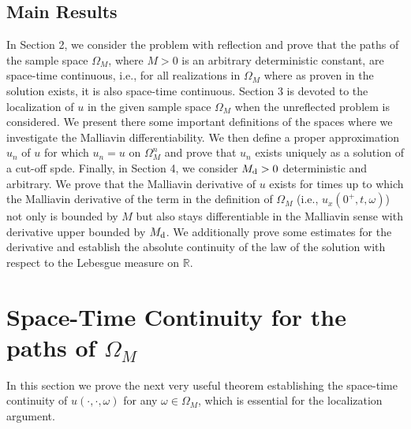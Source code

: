 \documentclass[reqno]{amsart}
\numberwithin{equation}{section}
\newcommand{\seira}[3]{\sum\limits_{#1}^{#2} #3}
\begin{document}
\subsection{Main Results}
In Section 2, we consider the problem with reflection and prove that the paths of the sample space $\Omega_M$, where $M>0$ is an arbitrary deterministic constant, are space-time continuous, i.e., for all realizations in $\Omega_M$ where as proven in \cite{BH,AFK2} the solution exists, it is also space-time continuous. Section 3 is devoted to the localization of $u$ in the given sample space $\Omega_M$ when the unreflected problem is considered. We present there some important definitions of the spaces where we investigate the Malliavin differentiability. We then define a proper approximation $u_n$ of $u$ for which $u_n=u$ on $\Omega_M^n$ and prove that $u_n$ exists uniquely as a solution of a cut-off spde. Finally, in Section 4, we consider $M_{\rm d}>0$ deterministic and arbitrary. We prove that the Malliavin derivative of $u$ exists for times up to which the Malliavin derivative of the term in the definition of $\Omega_M$ (i.e., $u_x(0^+,t,\omega)$) not only is bounded by $M$ but also stays differentiable in the Malliavin sense with derivative upper bounded by $M_{\rm d}$. We additionally prove some estimates for the derivative and establish the absolute continuity of the law of the solution with respect to the Lebesgue measure on $\mathbb R.$

\section{Space-Time Continuity for the paths of $\Omega_M$}
In this section we prove the next very useful theorem establishing
the space-time continuity of $u(\cdot,\cdot,\omega)$ for any
$\omega\in\Omega_M$, which is essential for the localization
argument.
\end{document}
